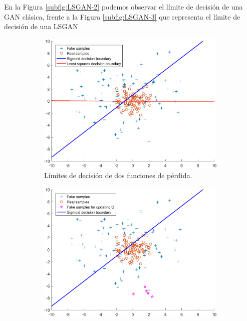 En la Figura \ref{subfig:LSGAN-2} podemos observar el límite de decisión de una \gls{GAN} clásica, frente a la Figura \ref{subfig:LSGAN-3} que representa el límite de decisión de una \gls{LSGAN}


\begin{figure}[H]
    \centering
    \captionsetup{justification=centering}
    \begin{subfigure}{.30\linewidth}
        \centering
        \includegraphics[width=0.95\linewidth]{figures/chapter02/boundary_1.pdf}
        \caption{Límites de decisión de dos funciones de pérdida. }
        \label{subfig:LSGAN-1}
    \end{subfigure}
    \vspace{0.03\linewidth}
    \begin{subfigure}{.30\linewidth}
        \centering
        \includegraphics[width=0.95\linewidth]{figures/chapter02/boundary_2.pdf}

\end{subfigure}
\end{figure}
